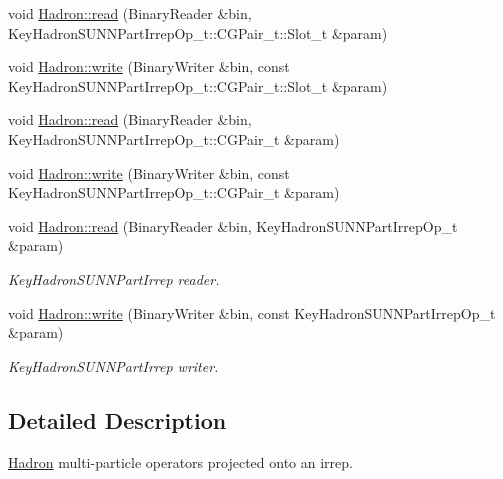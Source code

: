 \begin{DoxyCompactItemize}
void \mbox{\hyperlink{namespaceHadron_a5927f6c6b145b1ae72a2bc9461e617ca}{Hadron\+::read}} (Binary\+Reader \&bin, Key\+Hadron\+S\+U\+N\+N\+Part\+Irrep\+Op\+\_\+t\+::\+C\+G\+Pair\+\_\+t\+::\+Slot\+\_\+t \&param)
\item 
void \mbox{\hyperlink{namespaceHadron_ad5c8dc860360f98655b29f17b61f2a35}{Hadron\+::write}} (Binary\+Writer \&bin, const Key\+Hadron\+S\+U\+N\+N\+Part\+Irrep\+Op\+\_\+t\+::\+C\+G\+Pair\+\_\+t\+::\+Slot\+\_\+t \&param)
\item 
void \mbox{\hyperlink{namespaceHadron_ae56ab02908d10b1a8e5c2bad920dfe5a}{Hadron\+::read}} (Binary\+Reader \&bin, Key\+Hadron\+S\+U\+N\+N\+Part\+Irrep\+Op\+\_\+t\+::\+C\+G\+Pair\+\_\+t \&param)
\item 
void \mbox{\hyperlink{namespaceHadron_a53c6ec066bb836eb7474a8a18be8fea7}{Hadron\+::write}} (Binary\+Writer \&bin, const Key\+Hadron\+S\+U\+N\+N\+Part\+Irrep\+Op\+\_\+t\+::\+C\+G\+Pair\+\_\+t \&param)
\item 
void \mbox{\hyperlink{namespaceHadron_a05878acca51117e3c410ba16500c4ba5}{Hadron\+::read}} (Binary\+Reader \&bin, Key\+Hadron\+S\+U\+N\+N\+Part\+Irrep\+Op\+\_\+t \&param)
\begin{DoxyCompactList}\small\item\em Key\+Hadron\+S\+U\+N\+N\+Part\+Irrep reader. \end{DoxyCompactList}\item 
void \mbox{\hyperlink{namespaceHadron_a1ab9211268895b4f05c4d46ff18dff6d}{Hadron\+::write}} (Binary\+Writer \&bin, const Key\+Hadron\+S\+U\+N\+N\+Part\+Irrep\+Op\+\_\+t \&param)
\begin{DoxyCompactList}\small\item\em Key\+Hadron\+S\+U\+N\+N\+Part\+Irrep writer. \end{DoxyCompactList}\end{DoxyCompactItemize}


\subsection{Detailed Description}
\mbox{\hyperlink{namespaceHadron}{Hadron}} multi-\/particle operators projected onto an irrep. 

